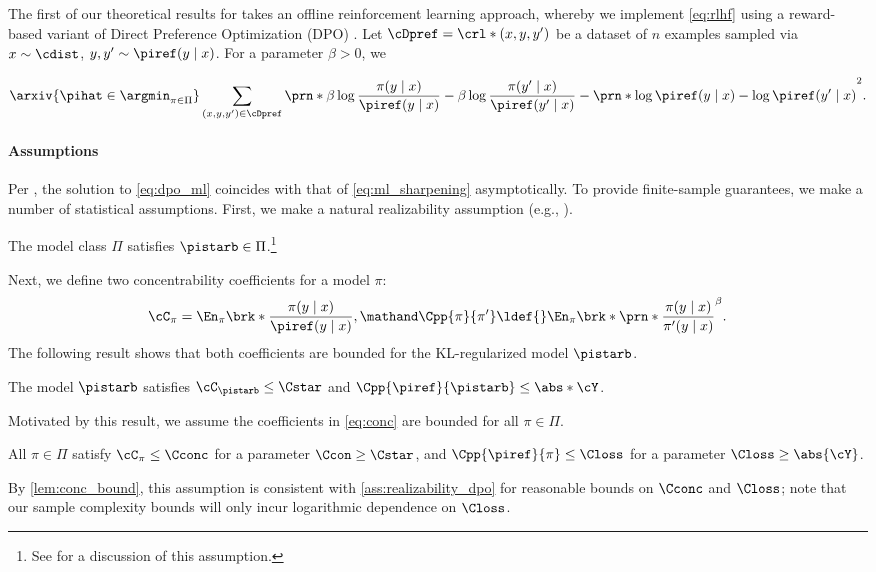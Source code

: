 The first of our theoretical results for \rlhfalg takes an
offline reinforcement learning approach, whereby we implement
\cref{eq:rlhf} using a reward-based variant of Direct Preference
Optimization (DPO) \citep{rafailov2024direct,gao2024rebel}. Let $\cDpref=\crl*{(x,y,y')}$ be a dataset of $n$ examples sampled via
$x\sim\cdist$, $y,y'\sim\piref(y\mid{}x)$. For a parameter $\beta>0$, we 
\begin{small}
  \begin{align}
    \label{eq:dpo_ml}
    \arxiv{\pihat\in \argmin_{\pi\in\Pi}}\sum_{(x,y,y')\in\cDpref}\prn*{
    \beta\log\frac{\pi(y\mid{}x)}{\piref(y\mid{}x)}-\beta\log\frac{\pi(y'\mid{}x)}{\piref(y'\mid{}x)}
    - \prn*{\log\piref(y\mid{}x)-\log\piref(y'\mid{}x)}
    }^2.
  \end{align}%
\end{small}%

\paragraph{Assumptions}
Per 
\iftoggle{workshop}{\cite{rafailov2024direct}}{\citet{rafailov2024direct}}, the solution to \cref{eq:dpo_ml} coincides
with that of \cref{eq:ml_sharpening} asymptotically. To provide
finite-sample guarantees, we make a number of statistical
assumptions. First, we make a natural realizability assumption (e.g., \iftoggle{workshop}{\cite{zhu2023principled,xie2024exploratory}}{\citet{zhu2023principled,xie2024exploratory}}).
\begin{assumption}[Realizability]
  \label{ass:realizability_dpo}
  The model class $\Pi$ satisfies $\pistarb\in\Pi$.\footnote{See  for a discussion of this assumption.}
\end{assumption}
Next, we define two concentrability coefficients for a
model $\pi$:
\begin{align}
  \label{eq:conc}
  \cC_{\pi} = \En_{\pi}\brk*{\frac{\pi(y\mid{}x)}{\piref(y\mid{}x)}},
  \mathand
\Cpp{\pi}{\pi'}\ldef{}\En_{\pi}\brk*{\prn*{\frac{\pi(y\mid{}x)}{\pi'(y\mid{}x)}}^{\beta}}.
\end{align}
The following result shows that both coefficients are bounded for the
KL-regularized model $\pistarb$.
\begin{lemma}
  \label{lem:conc_bound}
  The model $\pistarb$ satisfies $\cC_{\pistarb} \leq \Cstar$ and $\Cpp{\piref}{\pistarb} \leq{} \abs*{\cY}$.
\end{lemma}
Motivated by this result, we assume the coefficients in \cref{eq:conc}
are bounded for all $\pi\in\Pi$.
\begin{assumption}[Concentrability]
  \label{ass:conc-closs}
  All $\pi\in\Pi$ satisfy
  $\cC_{\pi} \leq \Cconc$
  for a parameter $\Ccon \geq \Cstar$, and
  $\Cpp{\piref}{\pi} \leq \Closs$
  for a parameter $\Closs \geq \abs{\cY}$.
\end{assumption}
By \cref{lem:conc_bound}, this assumption is consistent with
\cref{ass:realizability_dpo} for reasonable bounds on $\Cconc$ and
$\Closs$; note that our sample complexity bounds will only incur logarithmic dependence on $\Closs$.



